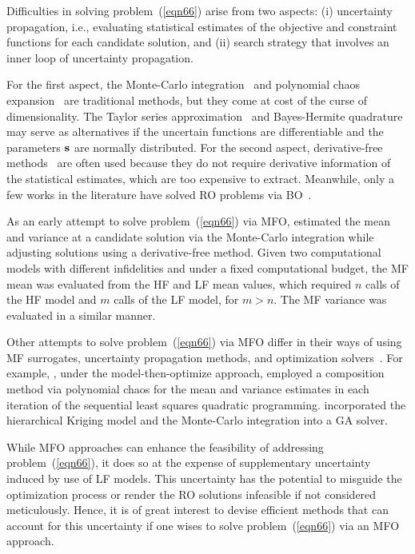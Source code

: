 \documentclass[iicol,sn-basic]{sn-jnl}%
\begin{document}
Difficulties in solving problem~(\ref{eqn66}) arise from two aspects: (i) uncertainty propagation, i.e., evaluating statistical estimates of the objective and constraint functions for each candidate solution, and (ii) search strategy that involves an inner loop of uncertainty propagation.

For the first aspect, the Monte-Carlo integration~\citep{Caflisch1998} and polynomial chaos expansion~\citep{Crestaux2009} are traditional methods, but they come at cost of the curse of dimensionality.
The Taylor series approximation~\citep{Anderson2012} and Bayes-Hermite quadrature~\citep{OHagan1991} may serve as alternatives if the uncertain functions are differentiable and the parameters $\bf s$ are normally distributed.
For the second aspect, derivative-free methods~\citep{Larson2019} are often used because they do not require derivative information of the statistical estimates, which are too expensive to extract.
Meanwhile, only a few works in the literature have solved RO problems via BO~\citep{Do2021,Daulton2022RMOBO}. 

As an early attempt to solve problem~(\ref{eqn66}) via MFO, \cite{Ng2014} estimated the mean and variance at a candidate solution via the Monte-Carlo integration while adjusting solutions using a derivative-free method.
Given two computational models with different infidelities and under a fixed computational budget, the MF mean was evaluated from the HF and LF mean values, which required $n$ calls of the HF model and $m$ calls of the LF model, for $m>n$.
The MF variance was evaluated in a similar manner.

Other attempts to solve problem~(\ref{eqn66}) via MFO differ in their ways of using MF surrogates, uncertainty propagation methods, and optimization solvers~\citep[see e.g.,][]{Shah2015,Fusi2015,Chakraborty2017,Zhou2018}.
For example, \cite{Shah2015}, under the model-then-optimize approach, employed a composition method via polynomial chaos for the mean and variance estimates in each iteration of the sequential least squares quadratic programming.
\cite{Zhou2018} incorporated the hierarchical Kriging model and the Monte-Carlo integration into a GA solver.

While MFO approaches can enhance the feasibility of addressing problem~(\ref{eqn66}), it does so at the expense of supplementary uncertainty induced by use of LF models.
This uncertainty has the potential to misguide the optimization process or render the RO solutions infeasible if not considered meticulously. 
Hence, it is of great interest to devise efficient methods that can account for this uncertainty if one wises to solve problem~(\ref{eqn66}) via an MFO approach.
\end{document}
